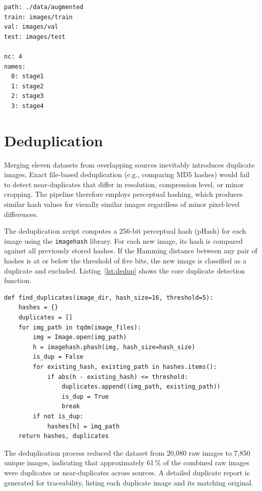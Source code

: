 \documentclass[a4paper,12pt,twoside]{report}
\begin{document}
\begin{lstlisting}[caption={Dataset configuration file for YOLOv8 training.},
  label={lst:dataset-yaml}, language={}]
path: ./data/augmented
train: images/train
val: images/val
test: images/test

nc: 4
names:
  0: stage1
  1: stage2
  2: stage3
  3: stage4
\end{lstlisting}

\section{Deduplication}
\label{sec:deduplication}

Merging eleven datasets from overlapping sources inevitably introduces duplicate
images. Exact file-based deduplication (e.g., comparing MD5 hashes) would fail
to detect near-duplicates that differ in resolution, compression level, or minor
cropping. The pipeline therefore employs perceptual hashing, which produces
similar hash values for visually similar images regardless of minor pixel-level
differences.

The deduplication script computes a 256-bit perceptual hash (pHash) for each
image using the \texttt{imagehash} library. For each new image, its hash is
compared against all previously stored hashes. If the Hamming distance between
any pair of hashes is at or below the threshold of five bits, the new image is
classified as a duplicate and excluded. Listing~\ref{lst:dedup} shows the core
duplicate detection function.

\begin{lstlisting}[caption={Perceptual hash-based duplicate detection.},
  label={lst:dedup}]
def find_duplicates(image_dir, hash_size=16, threshold=5):
    hashes = {}
    duplicates = []
    for img_path in tqdm(image_files):
        img = Image.open(img_path)
        h = imagehash.phash(img, hash_size=hash_size)
        is_dup = False
        for existing_hash, existing_path in hashes.items():
            if abs(h - existing_hash) <= threshold:
                duplicates.append((img_path, existing_path))
                is_dup = True
                break
        if not is_dup:
            hashes[h] = img_path
    return hashes, duplicates
\end{lstlisting}

The deduplication process reduced the dataset from 20,080 raw images to 7,850
unique images, indicating that approximately 61\,\% of the combined raw images
were duplicates or near-duplicates across sources. A detailed duplicate report
is generated for traceability, listing each duplicate image and its matching
original.
\end{document}
